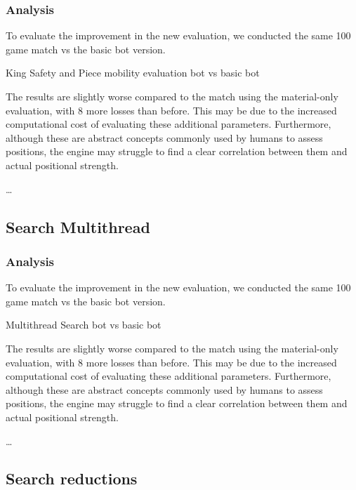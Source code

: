 \subsubsection{Analysis}

To evaluate the improvement in the new evaluation, we conducted the same 100 game match vs the basic bot version.

\vspace{1em}

King Safety and Piece mobility evaluation bot vs basic bot\\
\medskip

\noindent The results are slightly worse compared to the match using the material-only evaluation, with 8 more losses than before. This may be due to the increased computational cost of evaluating these additional parameters. Furthermore, although these are abstract concepts commonly used by humans to assess positions, the engine may struggle to find a clear correlation between them and actual positional strength.

\ldots

\subsection{Search Multithread}

\subsubsection{Analysis}

To evaluate the improvement in the new evaluation, we conducted the same 100 game match vs the basic bot version. 

\vspace{1em}

Multithread Search bot vs basic bot\\
\medskip

\noindent The results are slightly worse compared to the match using the material-only evaluation, with 8 more losses than before. This may be due to the increased computational cost of evaluating these additional parameters. Furthermore, although these are abstract concepts commonly used by humans to assess positions, the engine may struggle to find a clear correlation between them and actual positional strength.

\ldots

\subsection{Search reductions}


